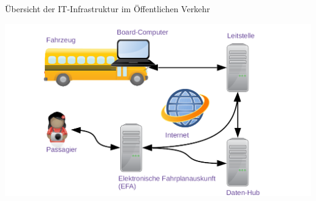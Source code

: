 
\begin{frame}{Übersicht der IT-Infrastruktur im Öffentlichen Verkehr}
  \begin{center}
    \includegraphics[width=1.1\textwidth]{otm-june-2-2021/public-transport-05-04-2021.png}
  \end{center}
\end{frame}
